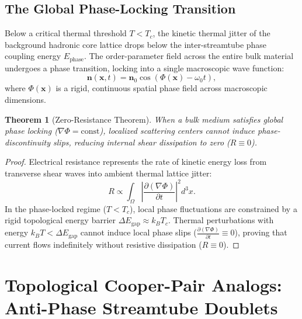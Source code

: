 \documentclass[11pt,a4paper]{article}
\newtheorem{thm}{Theorem}
\begin{document}
	\subsection{The Global Phase-Locking Transition}
	Below a critical thermal threshold $T < T_c$, the kinetic thermal jitter of the background hadronic core lattice drops below the inter-streamtube phase coupling energy $E_{\text{phase}}$. The order-parameter field across the entire bulk material undergoes a phase transition, locking into a single macroscopic wave function:
	\begin{equation}
		\mathbf{n}(\mathbf{x}, t) = \mathbf{n}_0 \cos\left( \Phi(\mathbf{x}) - \omega_0 t \right),
		\label{eq:macroscopic_phase_state}
	\end{equation}
	where $\Phi(\mathbf{x})$ is a rigid, continuous spatial phase field across macroscopic dimensions.
	
	\begin{thm}[Zero-Resistance Theorem]
		\label{thm:zero_resistance}
		When a bulk medium satisfies global phase locking ($\nabla \Phi = \text{const}$), localized scattering centers cannot induce phase-discontinuity slips, reducing internal shear dissipation to zero ($R \equiv 0$).
	\end{thm}
	
	\begin{proof}
		Electrical resistance represents the rate of kinetic energy loss from transverse shear waves into ambient thermal lattice jitter:
		\begin{equation}
			R \propto \int_{\Omega} \left| \frac{\partial (\nabla \Phi)}{\partial t} \right|^2 d^3x.
		\end{equation}
		In the phase-locked regime ($T < T_c$), local phase fluctuations are constrained by a rigid topological energy barrier $\Delta E_{\text{gap}} \approx k_B T_c$. Thermal perturbations with energy $k_B T < \Delta E_{\text{gap}}$ cannot induce local phase slips ($\frac{\partial (\nabla \Phi)}{\partial t} \equiv 0$), proving that current flows indefinitely without resistive dissipation ($R \equiv 0$).
	\end{proof}
	
	\section{Topological Cooper-Pair Analogs: Anti-Phase Streamtube Doublets}
	\label{sec:cooper_pair_analogs}
	
\end{document}
